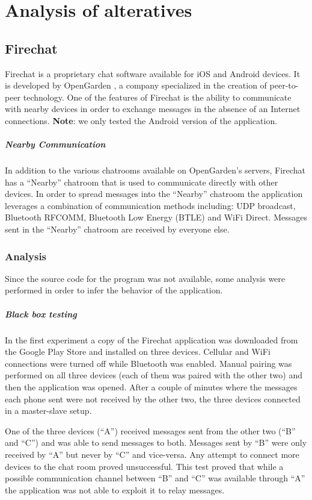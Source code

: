 \chapter{Analysis of alteratives}
\section{Firechat}
Firechat is a proprietary chat software available for iOS and Android devices.
It is developed by OpenGarden , a company specialized in the creation of peer-to-peer technology.
One of the features of Firechat is the ability to communicate with nearby devices in order to exchange messages in the absence of an Internet connections.
\textbf{Note}: we only tested the Android version of the application.

\paragraph{Nearby Communication} In addition to the various chatrooms available on OpenGarden's servers, Firechat has a ``Nearby'' chatroom that is used to communicate directly with other devices.
In order to spread messages into the ``Nearby'' chatroom the application leverages a combination of communication methods including: UDP broadcast, Bluetooth RFCOMM, Bluetooth Low Energy (BTLE) and WiFi Direct.
Messages sent in the ``Nearby'' chatroom are received by everyone else.

\subsection{Analysis}
Since the source code for the program was not available, some analysis were performed in order to infer the behavior of the application.

\paragraph{Black box testing}
In the first experiment a copy of the Firechat application was downloaded from the Google Play Store and installed on three devices.
Cellular and WiFi connections were turned off while Bluetooth was enabled.
Manual pairing was performed on all three devices (each of them was paired with the other two) and then the application was opened.
After a couple of minutes where the messages each phone sent were not received by the other two, the three devices connected in a master-slave setup.

One of the three devices (``A'') received messages sent from the other two (``B'' and ``C'') and was able to send messages to both.
Messages sent by ``B'' were only received by ``A'' but never by ``C'' and vice-versa.
Any attempt to connect more devices to the chat room proved unsuccessful.
This test proved that while a possible communication channel between ``B'' and ``C'' was available through ``A'' the application was not able to exploit it to relay messages.\\

